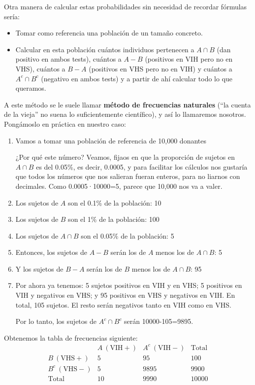 \documentclass[
]{book}
\theoremstyle{definition}
\theoremstyle{definition}
\theoremstyle{definition}
\theoremstyle{definition}
\theoremstyle{remark}
\begin{document}
Otra manera de calcular estas probabilidades sin necesidad de recordar fórmulas sería:

\begin{itemize}
\item
  Tomar como referencia una población de un tamaño concreto.
\item
  Calcular en esta población cuántos individuos pertenecen a \(A\cap B\) (dan positivo en ambos tests), cuántos a \(A-B\) (positivos en VIH pero no en VHS), cuántos a \(B-A\) (positivos en VHS pero no en VIH) y cuántos a \(A^c\cap B^c\) (negativo en ambos tests) y a partir de ahí calcular todo lo que queramos.
\end{itemize}

A este método se le suele llamar \textbf{método de frecuencias naturales} (``la cuenta de la vieja'' no suena lo suficientemente científico), y así lo llamaremos nosotros. Pongámoslo en práctica en nuestro caso:

\begin{enumerate}
\def\labelenumi{\arabic{enumi}.}
\item
  Vamos a tomar una población de referencia de 10,000 donantes

  ¿Por qué este número? Veamos, fijaos en que la proporción de sujetos en \(A\cap B\) es del 0.05\%, es decir, 0.0005, y para facilitar los cálculos nos gustaría que todos los números que nos salieran fueran enteros, para no liarnos con decimales. Como 0.0005·10000=5, parece que 10,000 nos va a valer.
\item
  Los sujetos de \(A\) son el 0.1\% de la población: 10
\item
  Los sujetos de \(B\) son el 1\% de la población: 100
\item
  Los sujetos de \(A\cap B\) son el 0.05\% de la población: 5
\item
  Entonces, los sujetos de \(A-B\) serán los de \(A\) menos los de \(A\cap B\): 5
\item
  Y los sujetos de \(B-A\) serán los de \(B\) menos los de \(A\cap B\): 95
\item
  Por ahora ya tenemos: 5 sujetos positivos en VIH y en VHS; 5 positivos en VIH y negativos en VHS; y 95 positivos en VHS y negativos en VIH. En total, 105 sujetos. El resto serán negativos tanto en VIH como en VHS.

  Por lo tanto, los sujetos de \(A^c\cap B^c\) serán 10000-105=9895.
\end{enumerate}

Obtenemos la tabla de frecuencias siguiente:
\[
\begin{array}{r|c|c|c}
& A\ (\text{VIH}+) & A^c \ (\text{VIH}-)  & \text{Total} \\ \hline
B\ (\text{VHS}+) &  5  &  95  &   100 \\ \hline
B^c\ (\text{VHS}-) &  5  &   9895  &   9900 \\ \hline 
\text{Total} & 10& 9990 & 10000  \\ 
\end{array}
\]
\end{document}
